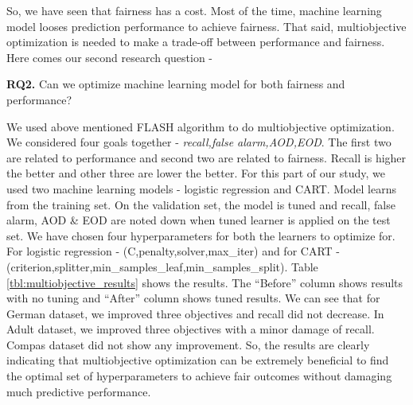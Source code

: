 \documentclass[10pt,conference]{IEEEtran}
\begin{document}
So, we have seen that fairness has a cost. Most of the time, machine learning model looses prediction performance to achieve fairness. That said, multiobjective optimization is needed to make a trade-off between performance and fairness. Here comes our second research question - 

\begin{RQ}
{\bf RQ2.} Can we optimize machine learning model for both fairness and performance?
\end{RQ}


We used above mentioned FLASH algorithm to do multiobjective optimization. We considered four goals together - \textit{recall,false alarm,AOD,EOD}. The first two are related to performance and second two are related to fairness. Recall is higher the better and other three are lower the better. For this part of our study, we used two machine learning models - logistic regression and CART. Model learns from the training set. On the validation set, the model is tuned and recall, false alarm, AOD \& EOD are noted down when tuned learner is applied on the test set. We have chosen four hyperparameters for both the learners to optimize for. For logistic regression - (C,penalty,solver,max\_iter) and for CART - (criterion,splitter,min\_samples\_leaf,min\_samples\_split). Table \ref{tbl:multiobjective_results} shows the results. The ``Before'' column shows results with no tuning and ``After'' column shows tuned results. We can see that for German dataset, we improved three objectives and recall did not decrease. In Adult dataset, we improved three objectives with a minor damage of recall. Compas dataset did not show any improvement. So, the results are clearly indicating that multiobjective  optimization can be extremely beneficial to find the optimal set of hyperparameters to achieve fair outcomes without damaging much predictive performance. 
\end{document}
